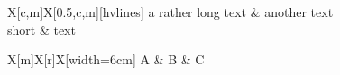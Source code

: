 \documentclass{article}
\begin{document}
\begin{NiceTabular}[width=9cm]{X[c,m]X[0.5,c,m]}[hvlines]
a rather long text & another text \\
short & text
\end{NiceTabular}

\begin{NiceTabular}{X[m]X[r]X}[width=6cm]
A & B & C
\end{NiceTabular}
\end{document}
